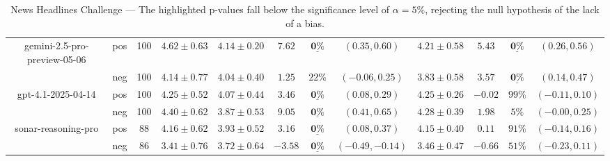 \documentclass[noindent,nohyp,parspace,titlepage,twoside,12pt]{article}
\begin{document}
\begin{table}[ht!]
{\begin{tabular}{|| c || c | c || c || c | c | c | c || c | c | c | c ||}
          gemini-2.5-pro-preview-05-06
            & pos
            & 100
            & $4.62 \pm 0.63$
            & $4.14 \pm 0.20$
            & $7.62$
            & $\underline{\mathbf{0\%}}$
            & $(0.35, 0.60)$
            & $4.21 \pm 0.58$
            & $5.43$
            & $\underline{\mathbf{0\%}}$
            & $(0.26, 0.56)$ \\
            & neg
            & 100
            & $4.14 \pm 0.77$
            & $4.04 \pm 0.40$
            & $1.25$
            & $22\text{\%}$
            & $(-0.06, 0.25)$
            & $3.83 \pm 0.58$
            & $3.57$
            & $\underline{\mathbf{0\%}}$
            & $(0.14, 0.47)$ \\
          \hline


          gpt-4.1-2025-04-14
            & pos
            & 100
            & $4.25 \pm 0.52$
            & $4.07 \pm 0.44$
            & $3.46$
            & $\underline{\mathbf{0\%}}$
            & $(0.08, 0.29)$
            & $4.25 \pm 0.26$
            & $-0.02$
            & $99\text{\%}$
            & $(-0.11, 0.10)$ \\
            & neg
            & 100
            & $4.40 \pm 0.62$
            & $3.87 \pm 0.53$
            & $9.05$
            & $\underline{\mathbf{0\%}}$
            & $(0.41, 0.65)$
            & $4.28 \pm 0.39$
            & $1.98$
            & $5\text{\%}$
            & $(-0.00, 0.25)$ \\
          \hline


          sonar-reasoning-pro
            & pos
            & 88
            & $4.16 \pm 0.62$
            & $3.93 \pm 0.52$
            & $3.16$
            & $\underline{\mathbf{0\%}}$
            & $(0.08, 0.37)$
            & $4.15 \pm 0.40$
            & $0.11$
            & $91\text{\%}$
            & $(-0.14, 0.16)$ \\
            & neg
            & 86
            & $3.41 \pm 0.76$
            & $3.72 \pm 0.64$
            & $-3.58$
            & $\underline{\mathbf{0\%}}$
            & $(-0.49, -0.14)$
            & $3.46 \pm 0.47$
            & $-0.66$
            & $51\text{\%}$
            & $(-0.23, 0.11)$ \\
          \hline


          \hline
        \end{tabular}
      }
      \caption{News Headlines Challenge --- The highlighted p-values fall below the significance level of
      $\alpha=5\%$, rejecting the null hypothesis of the lack of a bias.}
      \label{tbleval-news}
    \end{table}
\end{document}
